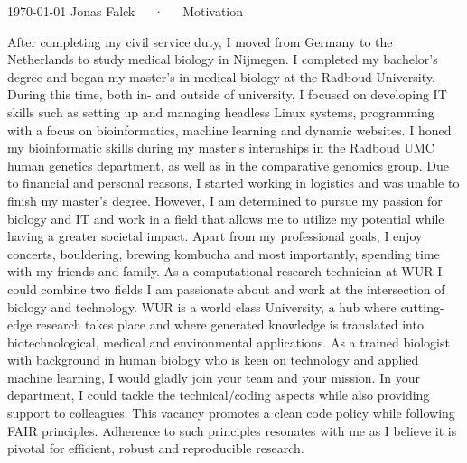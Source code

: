 \documentclass[11pt, a4paper]{awesome-cv}
\begin{document}
\makecvheader[R]

\makecvfooter
  {\today}
  {Jonas Falck~~~·~~~Motivation}
  {}

\makelettertitle
\begin{cvletter}

After completing my civil service duty, I moved from Germany to the Netherlands to study medical biology in Nijmegen. 
I completed my bachelor’s degree and began my master's in medical biology at the Radboud University. 
During this time, both in- and outside of university, I focused on developing IT skills such as setting up and managing headless Linux systems, programming with a focus on bioinformatics, machine learning and dynamic websites. 
I honed my bioinformatic skills during my master's internships in the Radboud UMC human genetics department, as well as in the comparative genomics group. 
Due to financial and personal reasons, I started working in logistics and was unable to finish my master’s degree. 
However, I am determined to pursue my passion for biology and IT and work in a field that allows me to utilize my potential while having a greater societal impact.
Apart from my professional goals, I enjoy concerts, bouldering, brewing kombucha and most importantly, spending time with my friends and family.
As a computational research technician at WUR I could combine two fields I am passionate about and work at the intersection of biology and technology.
WUR is a world class University, a hub where cutting-edge research takes place and where generated knowledge is translated into biotechnological, medical and environmental applications.
As a trained biologist with background in human biology who is keen on technology and applied machine learning, I would gladly join your team and your mission.
In your department, I could tackle the technical/coding aspects while also providing support to colleagues.
This vacancy promotes a clean code policy while following FAIR principles. 
Adherence to such principles resonates with me as I believe it is pivotal for efficient, robust and reproducible research.

\end{cvletter}
\end{document}
